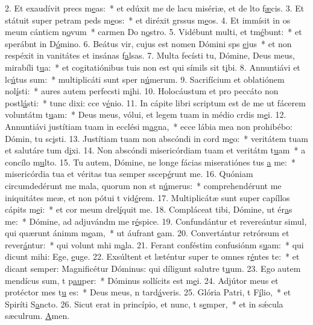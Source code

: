2. Et exaudívit precs m\uline{e}as:~* et edúxit me de lacu misériæ, et de lto f\uline{æ}cis.
3. Et státuit super petram peds m\uline{e}os:~* et diréxit grssus m\uline{e}os.
4. Et immísit in os meum cánticm n\uline{o}vum~* carmen Do n\uline{o}stro.
5. Vidébunt multi, et tm\uline{é}bunt:~* et sperábnt in D\uline{ó}mino.
6. Beátus vir, cujus est nomen Dómini sps \uline{e}jus~* et non respéxit in vanitátes et insánas f\uline{a}lsas.
7. Multa fecísti tu, Dómine, Deus meus, mirabíli t\uline{u}a:~* et cogitatiónibus tuis non est qui símils sit t\uline{i}bi.
8. Annuntiávi et lc\uline{ú}tus sum:~* multiplicáti sunt sper n\uline{ú}merum.
9. Sacrifícium et oblatiónem nol\uline{í}sti:~* aures autem perfecsti m\uline{i}hi.
10. Holocáustum et pro peccáto non postl\uline{á}sti:~* tunc dixi: cce v\uline{é}nio.
11. In cápite libri scriptum est de me ut fácerem voluntátm t\uline{u}am:~* Deus meus, vólui, et legem tuam in médio crdis m\uline{e}i.
12. Annuntiávi justítiam tuam in ecclési m\uline{a}gna,~* ecce lábia mea non prohibébo: Dómin, tu sc\uline{i}sti.
13. Justítiam tuam non abscóndi in cord m\uline{e}o:~* veritátem tuam et salutáre tum d\uline{i}xi.
14. Non abscóndi misericórdiam tuam et veritátm t\uline{u}am~* a concílo m\uline{u}lto.
15. Tu autem, Dómine, ne longe fácias miseratiónes tus \uline{a} me:~* misericórdia tua et véritas tua semper sscep\uline{é}runt me.
16. Quóniam circumdedérunt me mala, quorum non st n\uline{ú}merus:~* comprehendérunt me iniquitátes meæ, et non pótui t vid\uline{é}rem.
17. Multiplicátæ sunt super capíllos cápits m\uline{e}i:~* et cor meum drel\uline{í}quit me.
18. Compláceat tibi, Dómine, ut ér\uline{a}s me:~* Dómine, ad adjuvándm me r\uline{é}spice.
19. Confundántur et revereántur simul, qui quærunt ánimm m\uline{e}am,~* ut áufrant \uline{e}am.
20. Convertántur retrórsum et rever\uline{á}ntur:~* qui volunt mhi m\uline{a}la.
21. Ferant conféstim confusiónm s\uline{u}am:~* qui dicunt mihi: Ege, \uline{e}uge.
22. Exsúltent et læténtur super te omnes r\uline{é}ntes te:~* et dicant semper: Magnificétur Dóminus: qui díligunt salutre t\uline{u}um.
23. Ego autem mendícus sum, t p\uline{au}per:~* Dóminus sollícits est m\uline{e}i.
24. Adjútor meus et protéctor mes t\uline{u} es:~* Deus meus, n tard\uline{á}veris.
25. Glória Patri, t F\uline{í}lio,~* et Spiríti S\uline{a}ncto.
26. Sicut erat in princípio, et nunc, t s\uline{e}mper,~* et in sǽcula sæculrum. \uline{A}men.
